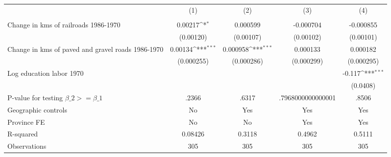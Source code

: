 {
\def\sym#1{\ifmmode^{#1}\else\(^{#1}\)\fi}
\begin{tabular}{l*{4}{c}}
\hline\hline
                &\multicolumn{1}{c}{(1)}&\multicolumn{1}{c}{(2)}&\multicolumn{1}{c}{(3)}&\multicolumn{1}{c}{(4)}\\
                &\multicolumn{1}{c}{}&\multicolumn{1}{c}{}&\multicolumn{1}{c}{}&\multicolumn{1}{c}{}\\
\hline
Change in kms of railroads 1986-1970&  0.00217\sym{*}  & 0.000599         &-0.000704         &-0.000855         \\
                &(0.00120)         &(0.00107)         &(0.00102)         &(0.00101)         \\
[1em]
Change in kms of paved and gravel roads 1986-1970&  0.00134\sym{***}& 0.000958\sym{***}& 0.000133         & 0.000182         \\
                &(0.000255)         &(0.000286)         &(0.000299)         &(0.000295)         \\
[1em]
Log education labor 1970&                  &                  &                  &   -0.117\sym{***}\\
                &                  &                  &                  & (0.0408)         \\
\hline
P-value for testing $\beta\_{2} >= \beta\_{1}$&    .2366         &    .6317         &.7968000000000001         &    .8506         \\
Geographic controls&       No         &      Yes         &      Yes         &      Yes         \\
Province FE     &       No         &       No         &      Yes         &      Yes         \\
R-squared       &  0.08426         &   0.3118         &   0.4962         &   0.5111         \\
Observations    &      305         &      305         &      305         &      305         \\
\hline\hline
\end{tabular}
}
